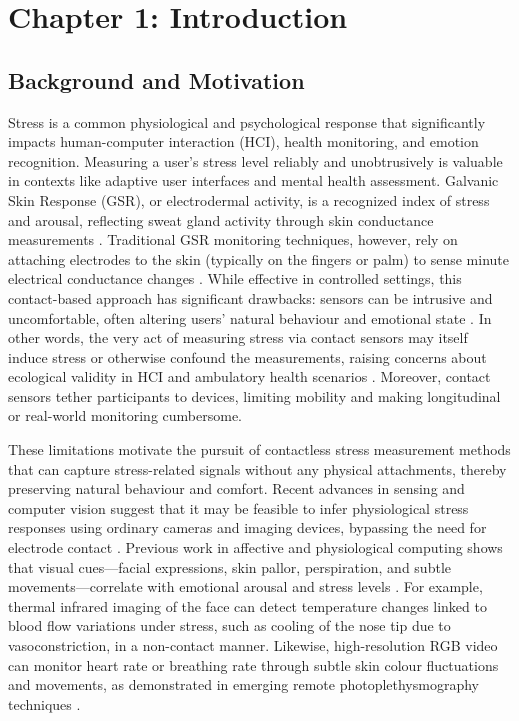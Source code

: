 \documentclass[11pt,a4paper]{report}
\begin{document}
\label{chap:1}
\chapter{Chapter 1: Introduction}

\section{Background and Motivation}

Stress is a common physiological and psychological response that significantly
impacts human-computer interaction (HCI), health monitoring, and emotion recognition.
Measuring a user's stress level reliably and unobtrusively is valuable in contexts
like adaptive user interfaces and mental health assessment.  Galvanic Skin Response
(GSR), or electrodermal activity, is a recognized index of stress and arousal,
reflecting sweat gland activity through skin conductance measurements
\cite{Boucsein2012}.  Traditional GSR monitoring techniques, however, rely on
attaching electrodes to the skin (typically on the fingers or palm) to sense minute
electrical conductance changes \cite{Fowles1981}.  While effective in controlled
settings, this contact-based approach has significant drawbacks: sensors can be
intrusive and uncomfortable, often altering users' natural behaviour and emotional
state \cite{Cacioppo2007}.  In other words, the very act of measuring stress via
contact sensors may itself induce stress or otherwise confound the measurements,
raising concerns about ecological validity in HCI and ambulatory health scenarios
\cite{Wilhelm2010}.  Moreover, contact sensors tether participants to devices,
limiting mobility and making longitudinal or real-world monitoring cumbersome.

These limitations motivate the pursuit of contactless stress measurement methods that
can capture stress-related signals without any physical attachments, thereby
preserving natural behaviour and comfort.  Recent advances in sensing and computer
vision suggest that it may be feasible to infer physiological stress responses using
ordinary cameras and imaging devices, bypassing the need for electrode
contact \cite{Picard2001}.  Previous work in affective and physiological computing
shows that visual cues—facial expressions, skin pallor, perspiration, and subtle
movements—correlate with emotional arousal and stress levels \cite{Healey2005}.  For
example, thermal infrared imaging of the face can detect temperature changes linked
to blood flow variations under stress, such as cooling of the nose tip due to
vasoconstriction, in a non-contact manner.  Likewise, high-resolution RGB video can
monitor heart rate or breathing rate through subtle skin colour fluctuations and
movements, as demonstrated in emerging remote photoplethysmography techniques
\cite{Poh2010}.
\end{document}
